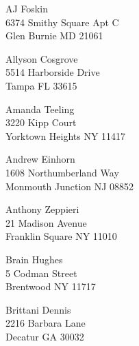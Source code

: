 \documentclass{article}
\begin{document}
\begin{center}
\begin{Huge}
\clearpage

\vspace*{\fill}
AJ Foskin\\
6374 Smithy Square Apt C\\
Glen Burnie MD 21061\\
\vspace{\fill}

\clearpage

\vspace*{\fill}
Allyson Cosgrove\\
5514 Harborside Drive\\
Tampa FL 33615\\
\vspace{\fill}

\clearpage

\vspace*{\fill}
Amanda Teeling\\
3220 Kipp Court\\
Yorktown Heights NY 11417\\
\vspace{\fill}

\clearpage

\vspace*{\fill}
Andrew Einhorn\\
1608 Northumberland Way\\
Monmouth Junction NJ 08852\\
\vspace{\fill}

\clearpage

\vspace*{\fill}
Anthony Zeppieri\\
21 Madison Avenue\\
Franklin Square NY 11010\\
\vspace{\fill}

\clearpage

\vspace*{\fill}
Brain Hughes\\
5 Codman Street\\
Brentwood NY 11717\\
\vspace{\fill}

\clearpage

\vspace*{\fill}
Brittani Dennis\\
2216 Barbara Lane\\
Decatur GA 30032\\
\vspace{\fill}


\end{Huge}
\end{center}
\end{document}
